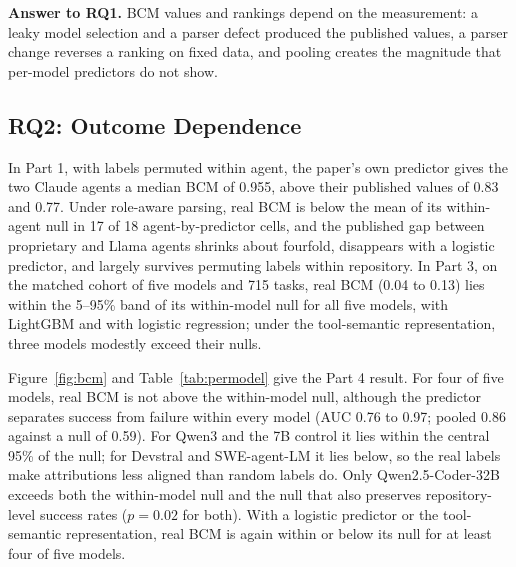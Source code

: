\documentclass[conference]{IEEEtran}
\newcommand{\bcm}{\textsc{BCM}}
\begin{document}
\textbf{Answer to RQ1.} \bcm{} values and rankings depend on the measurement: a leaky model selection and a parser defect produced the published values, a parser change reverses a ranking on fixed data, and pooling creates the magnitude that per-model predictors do not show.

\subsection{RQ2: Outcome Dependence}
\label{sec:rq2}
In Part 1, with labels permuted within agent, the paper's own predictor gives the two Claude agents a median \bcm{} of 0.955, above their published values of 0.83 and 0.77. Under role-aware parsing, real \bcm{} is below the mean of its within-agent null in 17 of 18 agent-by-predictor cells, and the published gap between proprietary and Llama agents shrinks about fourfold, disappears with a logistic predictor, and largely survives permuting labels within repository. In Part 3, on the matched cohort of five models and 715 tasks, real \bcm{} (0.04 to 0.13) lies within the 5--95\% band of its within-model null for all five models, with LightGBM and with logistic regression; under the tool-semantic representation, three models modestly exceed their nulls.

Figure~\ref{fig:bcm} and Table~\ref{tab:permodel} give the Part 4 result. For four of five models, real \bcm{} is not above the within-model null, although the predictor separates success from failure within every model (AUC 0.76 to 0.97; pooled 0.86 against a null of 0.59). For Qwen3 and the 7B control it lies within the central 95\% of the null; for Devstral and SWE-agent-LM it lies below, so the real labels make attributions less aligned than random labels do. Only Qwen2.5-Coder-32B exceeds both the within-model null and the null that also preserves repository-level success rates ($p=0.02$ for both). With a logistic predictor or the tool-semantic representation, real \bcm{} is again within or below its null for at least four of five models.
\end{document}
